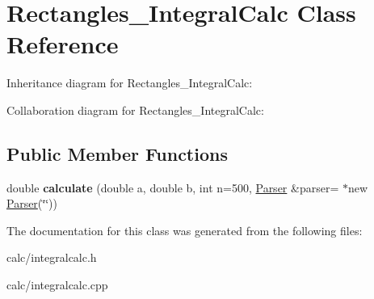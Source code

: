 \hypertarget{class_rectangles___integral_calc}{}\section{Rectangles\+\_\+\+Integral\+Calc Class Reference}
\label{class_rectangles___integral_calc}


Inheritance diagram for Rectangles\+\_\+\+Integral\+Calc\+:


Collaboration diagram for Rectangles\+\_\+\+Integral\+Calc\+:
\subsection*{Public Member Functions}
\begin{DoxyCompactItemize}
\item 
\hypertarget{class_rectangles___integral_calc_ab5522dbba87eb7e94d8609956acc294d}{}\label{class_rectangles___integral_calc_ab5522dbba87eb7e94d8609956acc294d} 
double {\bfseries calculate} (double a, double b, int n=500, \hyperlink{class_parser}{Parser} \&parser= $\ast$new \hyperlink{class_parser}{Parser}(\char`\"{}\char`\"{}))
\end{DoxyCompactItemize}


The documentation for this class was generated from the following files\+:\begin{DoxyCompactItemize}
\item 
calc/integralcalc.\+h\item 
calc/integralcalc.\+cpp\end{DoxyCompactItemize}
